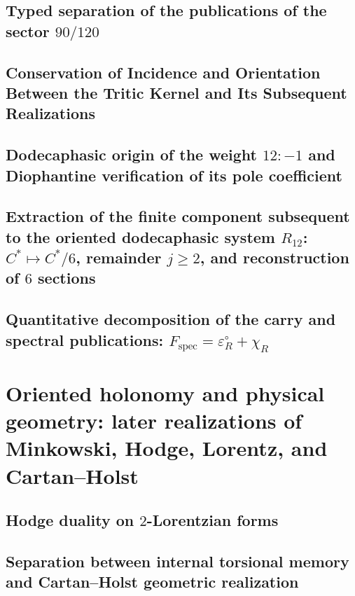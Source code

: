 \subsection{Typed separation of the publications of the sector \(90/120\)}

\subsection{Conservation of Incidence and Orientation Between the Tritic Kernel and Its Subsequent Realizations}

\subsection{Dodecaphasic origin of the weight \(12:-1\) and Diophantine verification of its pole coefficient}

\subsection{Extraction of the finite component subsequent to the oriented dodecaphasic system \(R_{12}\): \(C^*\mapsto C^*/6\), remainder \(j\ge2\), and reconstruction of \(6\) sections}

\subsection{Quantitative decomposition of the carry and spectral publications: \(F_{\mathrm{spec}}=\varepsilon_R^\circ+\chi_R\)}


\section{Oriented holonomy and physical geometry: later realizations of Minkowski, Hodge, Lorentz, and Cartan--Holst}

\subsection{Hodge duality on \(2\)-Lorentzian forms}

\subsection{Separation between internal torsional memory and Cartan--Holst geometric realization}


